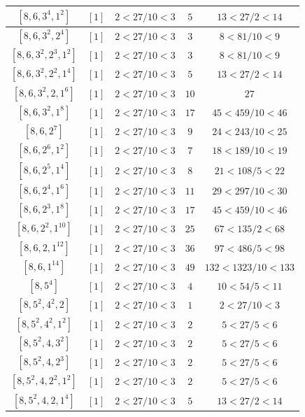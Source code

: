 \documentclass{article}%
\begin{document}
\begin{center}
\begin{longtable}{||c|c|c|c|c||}
$[8, 6, 3^{4}, 1^{2}]$ & $[1]$ & $2 < 27/10 < 3$ & $5$ & $13 < 27/2 < 14$ \\ \hline 
$[8, 6, 3^{2}, 2^{4}]$ & $[1]$ & $2 < 27/10 < 3$ & $3$ & $8 < 81/10 < 9$ \\ \hline 
$[8, 6, 3^{2}, 2^{3}, 1^{2}]$ & $[1]$ & $2 < 27/10 < 3$ & $3$ & $8 < 81/10 < 9$ \\ \hline 
$[8, 6, 3^{2}, 2^{2}, 1^{4}]$ & $[1]$ & $2 < 27/10 < 3$ & $5$ & $13 < 27/2 < 14$ \\ \hline 
$[8, 6, 3^{2}, 2, 1^{6}]$ & $[1]$ & $2 < 27/10 < 3$ & $10$ & $27$ \\ \hline 
$[8, 6, 3^{2}, 1^{8}]$ & $[1]$ & $2 < 27/10 < 3$ & $17$ & $45 < 459/10 < 46$ \\ \hline 
$[8, 6, 2^{7}]$ & $[1]$ & $2 < 27/10 < 3$ & $9$ & $24 < 243/10 < 25$ \\ \hline 
$[8, 6, 2^{6}, 1^{2}]$ & $[1]$ & $2 < 27/10 < 3$ & $7$ & $18 < 189/10 < 19$ \\ \hline 
$[8, 6, 2^{5}, 1^{4}]$ & $[1]$ & $2 < 27/10 < 3$ & $8$ & $21 < 108/5 < 22$ \\ \hline 
$[8, 6, 2^{4}, 1^{6}]$ & $[1]$ & $2 < 27/10 < 3$ & $11$ & $29 < 297/10 < 30$ \\ \hline 
$[8, 6, 2^{3}, 1^{8}]$ & $[1]$ & $2 < 27/10 < 3$ & $17$ & $45 < 459/10 < 46$ \\ \hline 
$[8, 6, 2^{2}, 1^{10}]$ & $[1]$ & $2 < 27/10 < 3$ & $25$ & $67 < 135/2 < 68$ \\ \hline 
$[8, 6, 2, 1^{12}]$ & $[1]$ & $2 < 27/10 < 3$ & $36$ & $97 < 486/5 < 98$ \\ \hline 
$[8, 6, 1^{14}]$ & $[1]$ & $2 < 27/10 < 3$ & $49$ & $132 < 1323/10 < 133$ \\ \hline 
$[8, 5^{4}]$ & $[1]$ & $2 < 27/10 < 3$ & $4$ & $10 < 54/5 < 11$ \\ \hline 
$[8, 5^{2}, 4^{2}, 2]$ & $[1]$ & $2 < 27/10 < 3$ & $1$ & $2 < 27/10 < 3$ \\ \hline 
$[8, 5^{2}, 4^{2}, 1^{2}]$ & $[1]$ & $2 < 27/10 < 3$ & $2$ & $5 < 27/5 < 6$ \\ \hline 
$[8, 5^{2}, 4, 3^{2}]$ & $[1]$ & $2 < 27/10 < 3$ & $2$ & $5 < 27/5 < 6$ \\ \hline 
$[8, 5^{2}, 4, 2^{3}]$ & $[1]$ & $2 < 27/10 < 3$ & $2$ & $5 < 27/5 < 6$ \\ \hline 
$[8, 5^{2}, 4, 2^{2}, 1^{2}]$ & $[1]$ & $2 < 27/10 < 3$ & $2$ & $5 < 27/5 < 6$ \\ \hline 
$[8, 5^{2}, 4, 2, 1^{4}]$ & $[1]$ & $2 < 27/10 < 3$ & $5$ & $13 < 27/2 < 14$ \\ \hline 

\end{longtable}
\end{center}
\end{document}
